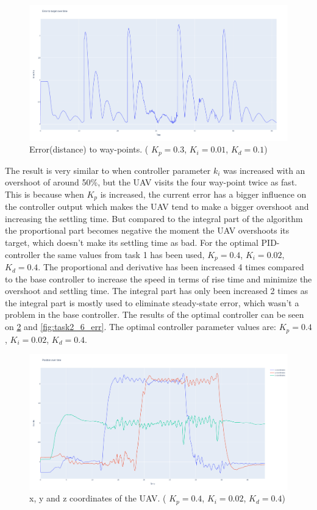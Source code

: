 \documentclass[conference]{IEEEtran}
\begin{document}
\begin{figure}[hbtp]
	\centering
	\includegraphics[width=1.0\linewidth]{images/task2_2_err.png}
	\caption{Error(distance) to way-points. ( $K_p = 0.3$, $K_i = 0.01$, $K_d = 0.1$)}
	\label{fig:task2_2_err}
\end{figure}

The result is very similar to when controller parameter $k_i$ was increased with an overshoot of around 50\%, but the UAV visits the four way-point twice as fast. This is because when $K_p$ is increased, the current error has a bigger influence on the controller output which makes the UAV tend to make a bigger overshoot and increasing the settling time. But compared to the integral part of the algorithm the proportional part becomes negative the moment the UAV overshoots its target, which doesn't make its settling time as bad. 
For the optimal PID-controller the same values from task 1 has been used, $K_p = 0.4$, $K_i = 0.02$, $K_d = 0.4$. 
The proportional and derivative has been increased 4 times compared to the base controller to increase the speed in terms of rise time and minimize the overshoot and settling time. The integral part has only been increased 2 times as the integral part is mostly used to eliminate steady-state error, which wasn't a problem in the base controller. The results of the optimal controller can be seen on \cref{fig:task2_6_pos} and \cref{fig:task2_6_err}. The optimal controller parameter values are: $K_p = 0.4$, $K_i = 0.02$, $K_d = 0.4$.

\begin{figure}[hbtp]
	\centering
	\includegraphics[width=1.0\linewidth]{images/task2_6_pos.png}
	\caption{x, y and z coordinates of the UAV. ( $K_p = 0.4$, $K_i = 0.02$, $K_d = 0.4$)}
	\label{fig:task2_6_pos}
\end{figure}
\end{document}
